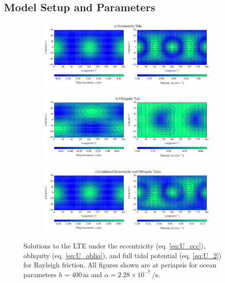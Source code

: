 \subsection{Model Setup and Parameters \label{subsec:param}}

\begin{figure}[!t]
\begin{subfigure}{\linewidth}
\centering
\includegraphics[width=0.9\linewidth,trim={0 0 0 0.2cm},clip]{Figures/Ecc_test}
\subcaption{\label{fig:LTE_a}}
\end{subfigure}\vspace*{-0.7cm}
\begin{subfigure}{\linewidth}
\centering
\includegraphics[width=0.9\linewidth]{Figures/Obliq_test}
\subcaption{\label{fig:LTE_b}}
\end{subfigure}\vspace*{-0.7cm}
\begin{subfigure}{\linewidth}
\centering
\includegraphics[width=0.9\linewidth]{Figures/Full_test}
\subcaption{\label{fig:LTE_c}}
\end{subfigure}\vspace*{-0.8cm}
\caption{Solutions to the LTE under the eccentricity (eq. \ref{eq:U_ecc}), obliquity (eq. \ref{eq:U_obliq}), and full tidal potential (eq. \ref{eq:U_2}) for Rayleigh friction. All figures shown are at periapsis for ocean parameters $h = 400 \, \si{\metre}$ and $\alpha = 2.28 \times 10^{-7} \, \si{\per\second}$. \label{fig:LTE_solns}}
\end{figure}


